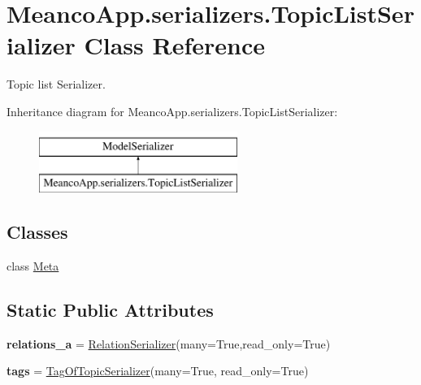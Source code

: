 \hypertarget{class_meanco_app_1_1serializers_1_1_topic_list_serializer}{}\section{Meanco\+App.\+serializers.\+Topic\+List\+Serializer Class Reference}
\label{class_meanco_app_1_1serializers_1_1_topic_list_serializer}


Topic list Serializer.  


Inheritance diagram for Meanco\+App.\+serializers.\+Topic\+List\+Serializer\+:\begin{figure}[H]
\begin{center}
\leavevmode
\includegraphics[height=2.000000cm]{class_meanco_app_1_1serializers_1_1_topic_list_serializer}
\end{center}
\end{figure}
\subsection*{Classes}
\begin{DoxyCompactItemize}
\item 
class \hyperlink{class_meanco_app_1_1serializers_1_1_topic_list_serializer_1_1_meta}{Meta}
\end{DoxyCompactItemize}
\subsection*{Static Public Attributes}
\begin{DoxyCompactItemize}
\item 
\hypertarget{class_meanco_app_1_1serializers_1_1_topic_list_serializer_a41e3ac29c99fda97d4c270f9a1dc5187}{}\label{class_meanco_app_1_1serializers_1_1_topic_list_serializer_a41e3ac29c99fda97d4c270f9a1dc5187} 
{\bfseries relations\+\_\+a} = \hyperlink{class_meanco_app_1_1serializers_1_1_relation_serializer}{Relation\+Serializer}(many=True,read\+\_\+only=True)
\item 
\hypertarget{class_meanco_app_1_1serializers_1_1_topic_list_serializer_a6d1583692e1ecde860322182eddc0100}{}\label{class_meanco_app_1_1serializers_1_1_topic_list_serializer_a6d1583692e1ecde860322182eddc0100} 
{\bfseries tags} = \hyperlink{class_meanco_app_1_1serializers_1_1_tag_of_topic_serializer}{Tag\+Of\+Topic\+Serializer}(many=True, read\+\_\+only=True)
\end{DoxyCompactItemize}


